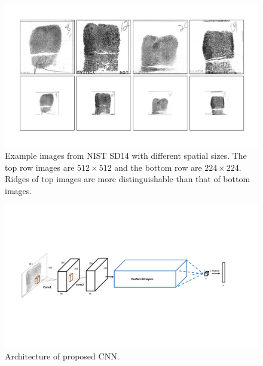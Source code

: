 %
\begin{figure}[!ht]
	\begin{center}
		\includegraphics[scale=0.28,clip=true,trim = 20mm 15mm 10mm 10mm]{fig/figs/resize_examples.pdf}
	\end{center}
	\caption{Example images from NIST SD14 with different spatial sizes. The top row images are $512\times512$ and the bottom row are $224\times224$. Ridges of top images are more distinguishable than that of bottom images. } 
	\label{fig.resize_examples}
\end{figure}
%
%
\begin{figure}[!ht]
	\begin{center}
		\includegraphics[scale=0.65,clip=true,trim = 20mm 65mm 30mm 65mm]{fig/figs/cnn_arch.pdf}
	\end{center}
	\caption{Architecture of proposed CNN.} 
	\label{fig.cnn_arch}
\end{figure}


